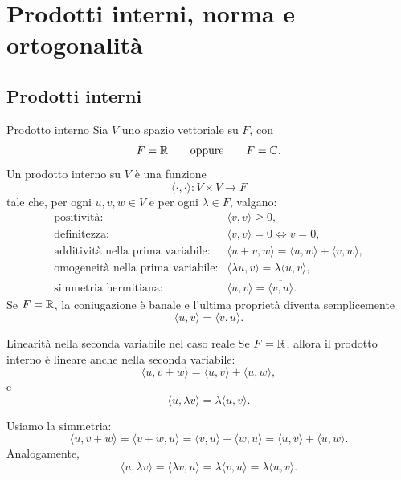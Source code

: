 \documentclass[a4paper]{article}
\begin{document}
\section{Prodotti interni, norma e ortogonalità}

\subsection{Prodotti interni}

\begin{snippetdefinition}{Prodotto interno}
    Sia \(V\) uno spazio vettoriale su \(F\), con
    \[
        F=\mathbb{R}
        \qquad
        \text{oppure}
        \qquad
        F=\mathbb{C}.
    \]
    Un prodotto interno su \(V\) è una funzione
    \[
        \langle\cdot,\cdot\rangle:V\times V\to F
    \]
    tale che, per ogni \(u,v,w\in V\) e per ogni \(\lambda\in F\), valgano:
    \[
        \begin{array}{ll}
            \text{positività:} &
            \langle v,v\rangle\geq 0,\\[1mm]
            \text{definitezza:} &
            \langle v,v\rangle=0 \Longleftrightarrow v=0,\\[1mm]
            \text{additività nella prima variabile:} &
            \langle u+v,w\rangle=\langle u,w\rangle+\langle v,w\rangle,\\[1mm]
            \text{omogeneità nella prima variabile:} &
            \langle \lambda u,v\rangle=\lambda\langle u,v\rangle,\\[1mm]
            \text{simmetria hermitiana:} &
            \langle u,v\rangle=\overline{\langle v,u\rangle}.
        \end{array}
    \]
    Se \(F=\mathbb{R}\), la coniugazione è banale e l'ultima proprietà diventa semplicemente
    \[
        \langle u,v\rangle=\langle v,u\rangle.
    \]
\end{snippetdefinition}

\begin{snippetproposition}{Linearità nella seconda variabile nel caso reale}
    Se \(F=\mathbb{R}\), allora il prodotto interno è lineare anche nella seconda variabile:
    \[
        \langle u,v+w\rangle=\langle u,v\rangle+\langle u,w\rangle,
    \]
    e
    \[
        \langle u,\lambda v\rangle=\lambda\langle u,v\rangle.
    \]
\end{snippetproposition}

\begin{snippetproof}{}
    Usiamo la simmetria:
    \[
        \langle u,v+w\rangle
        =
        \langle v+w,u\rangle
        =
        \langle v,u\rangle+\langle w,u\rangle
        =
        \langle u,v\rangle+\langle u,w\rangle.
    \]
    Analogamente,
    \[
        \langle u,\lambda v\rangle
        =
        \langle \lambda v,u\rangle
        =
        \lambda\langle v,u\rangle
        =
        \lambda\langle u,v\rangle.
    \]
\end{snippetproof}
\end{document}
